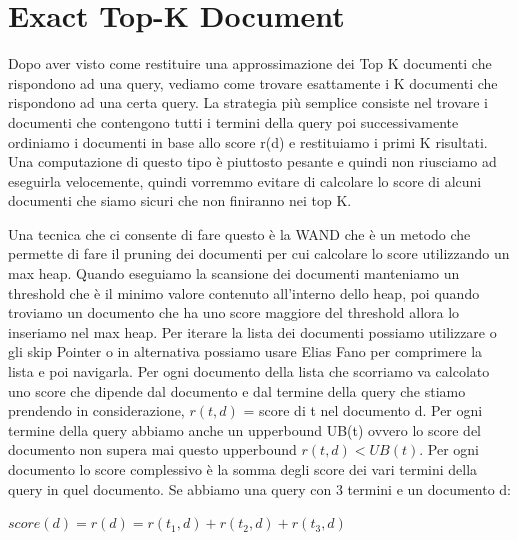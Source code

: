 \documentclass[14pt]{extreport}
\begin{document}
\section{Exact Top-K Document}

Dopo aver visto come restituire una approssimazione dei Top K documenti che rispondono ad una query, vediamo come trovare esattamente i K documenti che rispondono ad una certa query.
La strategia più semplice consiste nel trovare i documenti che contengono tutti i termini della query poi successivamente ordiniamo i documenti in base allo score r(d) e restituiamo i primi K risultati.
Una computazione di questo tipo è piuttosto pesante e quindi non riusciamo ad eseguirla velocemente, quindi vorremmo evitare di calcolare lo score di alcuni documenti che siamo sicuri che non finiranno nei top K.

Una tecnica che ci consente di fare questo è la WAND che è un metodo che permette di fare il pruning dei documenti per cui calcolare lo score utilizzando un max heap.
Quando eseguiamo la scansione dei documenti manteniamo un threshold che è il minimo valore contenuto all'interno dello heap, poi quando troviamo un documento che ha uno score maggiore del threshold allora lo inseriamo nel max heap.
Per iterare la lista dei documenti possiamo utilizzare o gli skip Pointer o in alternativa possiamo usare Elias Fano per comprimere la lista e poi navigarla.
Per ogni documento della lista che scorriamo va calcolato uno score che dipende dal documento e dal termine della query che stiamo prendendo in considerazione, $r(t,d)$ = score di t nel documento d.
Per ogni termine della query abbiamo anche un upperbound UB(t) ovvero lo score del documento non supera mai questo upperbound $r(t,d) < UB(t)$.
Per ogni documento lo score complessivo è la somma degli score dei vari termini della query in quel documento. Se abbiamo una query con 3 termini e un documento d:
\newline
\centerline{$score(d) = r(d) = r(t_1,d) + r(t_2,d) + r(t_3,d)$}
\end{document}
